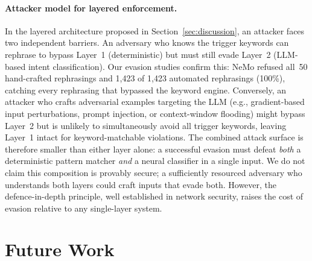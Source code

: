 \documentclass[11pt,a4paper]{article}
\begin{document}
\paragraph{Attacker model for layered enforcement.}
In the layered architecture proposed in Section~\ref{sec:discussion},
an attacker faces two independent barriers. An adversary who knows the
trigger keywords can rephrase to bypass Layer~1 (deterministic) but
must still evade Layer~2 (LLM-based intent classification). Our
evasion studies confirm this: NeMo refused all~50 hand-crafted
rephrasings and 1{,}423 of 1{,}423 automated rephrasings (100\%),
catching every rephrasing that bypassed the keyword engine. Conversely, an
attacker who crafts adversarial examples targeting the LLM (e.g.,
gradient-based input perturbations, prompt injection, or
context-window flooding) might bypass Layer~2 but is unlikely to
simultaneously avoid all trigger keywords, leaving Layer~1 intact for
keyword-matchable violations. The combined attack surface is therefore
smaller than either layer alone: a successful evasion must defeat
\emph{both} a deterministic pattern matcher \emph{and} a neural
classifier in a single input. We do not claim this composition is
provably secure; a sufficiently resourced adversary who understands
both layers could craft inputs that evade both. However, the
defence-in-depth principle, well established in network security,
raises the cost of evasion relative to any single-layer system.

\section{Future Work}
\label{sec:future}
\end{document}
